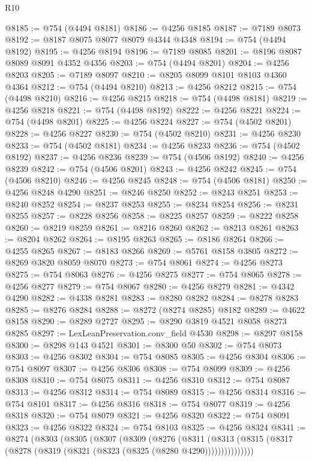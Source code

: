 \begin{lexlean}{R10}
\begin{coremodule}
@8185 := @754 (@4494 @8181)
@8186 := @4256 @8185
@8187 := @7189 @8073
@8192 := @8187 @8075 @8077 @8079 @4344 @4348
@8194 := @754 (@4494 @8192)
@8195 := @4256 @8194
@8196 := @7189 @8085
@8201 := @8196 @8087 @8089 @8091 @4352 @4356
@8203 := @754 (@4494 @8201)
@8204 := @4256 @8203
@8205 := @7189 @8097
@8210 := @8205 @8099 @8101 @8103 @4360 @4364
@8212 := @754 (@4494 @8210)
@8213 := @4256 @8212
@8215 := @754 (@4498 @8210)
@8216 := @4256 @8215
@8218 := @754 (@4498 @8181)
@8219 := @4256 @8218
@8221 := @754 (@4498 @8192)
@8222 := @4256 @8221
@8224 := @754 (@4498 @8201)
@8225 := @4256 @8224
@8227 := @754 (@4502 @8201)
@8228 := @4256 @8227
@8230 := @754 (@4502 @8210)
@8231 := @4256 @8230
@8233 := @754 (@4502 @8181)
@8234 := @4256 @8233
@8236 := @754 (@4502 @8192)
@8237 := @4256 @8236
@8239 := @754 (@4506 @8192)
@8240 := @4256 @8239
@8242 := @754 (@4506 @8201)
@8243 := @4256 @8242
@8245 := @754 (@4506 @8210)
@8246 := @4256 @8245
@8248 := @754 (@4506 @8181)
@8250 := @4256 @8248 @4290
@8251 := @8246 @8250
@8252 := @8243 @8251
@8253 := @8240 @8252
@8254 := @8237 @8253
@8255 := @8234 @8254
@8256 := @8231 @8255
@8257 := @8228 @8256
@8258 := @8225 @8257
@8259 := @8222 @8258
@8260 := @8219 @8259
@8261 := @8216 @8260
@8262 := @8213 @8261
@8263 := @8204 @8262
@8264 := @8195 @8263
@8265 := @8186 @8264
@8266 := @4255 @8265
@8267 := @8183 @8266
@8269 := @5761 @8158 @3805
@8272 := @8269 @3820 @8059 @8070
@8273 := @754 @8061
@8274 := @4256 @8273
@8275 := @754 @8063
@8276 := @4256 @8275
@8277 := @754 @8065
@8278 := @4256 @8277
@8279 := @754 @8067
@8280 := @4256 @8279
@8281 := @4342 @4290
@8282 := @4338 @8281
@8283 := @8280 @8282
@8284 := @8278 @8283
@8285 := @8276 @8284
@8288 := @8272 (@8274 @8285) @8182
@8289 := @4622 @8158
@8290 := @8289 @2727
@8295 := @8290 @3819 @4521 @8058 @8273 @8285
@8297 := LexLeanPreservation.conv_field @4530
@8298 := @8297 @8158
@8300 := @8298 @143 @4521
@8301 := @8300 @50
@8302 := @754 @8073
@8303 := @4256 @8302
@8304 := @754 @8085
@8305 := @4256 @8304
@8306 := @754 @8097
@8307 := @4256 @8306
@8308 := @754 @8099
@8309 := @4256 @8308
@8310 := @754 @8075
@8311 := @4256 @8310
@8312 := @754 @8087
@8313 := @4256 @8312
@8314 := @754 @8089
@8315 := @4256 @8314
@8316 := @754 @8101
@8317 := @4256 @8316
@8318 := @754 @8077
@8319 := @4256 @8318
@8320 := @754 @8079
@8321 := @4256 @8320
@8322 := @754 @8091
@8323 := @4256 @8322
@8324 := @754 @8103
@8325 := @4256 @8324
@8341 := @8274
    (@8303
      (@8305
        (@8307
          (@8309
            (@8276
              (@8311
                (@8313 (@8315 (@8317 (@8278 (@8319 (@8321 (@8323 (@8325 (@8280 @4290)))))))))))))))

\end{coremodule}
\end{lexlean}

